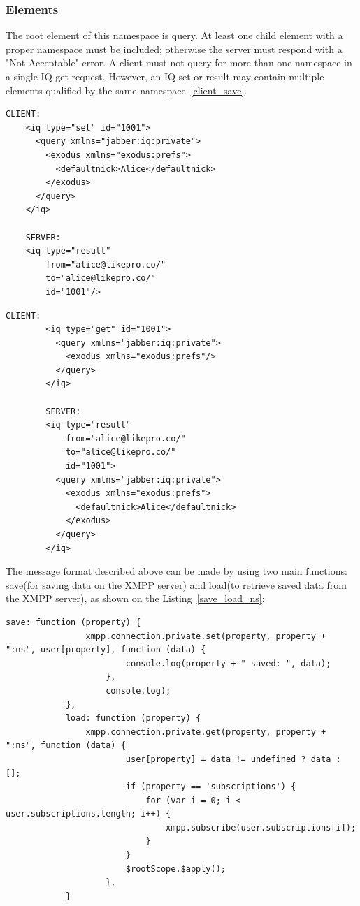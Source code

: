 	\subsubsection{Elements}
	The root element of this namespace is query. At least one child element with a proper namespace must be included; otherwise the server must respond with a "Not Acceptable" error. A client must not query for more than one namespace in a single IQ get request. However, an IQ set or result may contain multiple elements qualified by the same namespace~\ref{client_save}.
    \begin{lstlisting}[label=client_save,caption=Client Stores Private Data]
	CLIENT:
	<iq type="set" id="1001">
	  <query xmlns="jabber:iq:private">
	    <exodus xmlns="exodus:prefs">
	      <defaultnick>Alice</defaultnick>
	    </exodus>
	  </query>
	</iq>

	SERVER:
	<iq type="result"
	    from="alice@likepro.co/"
	    to="alice@likepro.co/"
	    id="1001"/>
    \end{lstlisting}

     \begin{lstlisting}[label=client_load,caption=Client Retrieves Private Data]
		CLIENT:
		<iq type="get" id="1001">
		  <query xmlns="jabber:iq:private">
		    <exodus xmlns="exodus:prefs"/>
		  </query>
		</iq>

		SERVER:
		<iq type="result"
		    from="alice@likepro.co/"
		    to="alice@likepro.co/"
		    id="1001">
		  <query xmlns="jabber:iq:private">
		    <exodus xmlns="exodus:prefs">
		      <defaultnick>Alice</defaultnick>
		    </exodus>
		  </query>
		</iq>
    \end{lstlisting}

    The message format described above can be made by using two main functions: save(for saving data on the XMPP server) and load(to retrieve saved data from the XMPP server), as shown on the Listing~\ref{save_load_ns}:
	\begin{lstlisting}[label=save_load_ns,caption=Snippet of Save/Load preferences to a private namespace]
	      	save: function (property) {
	            xmpp.connection.private.set(property, property + ":ns", user[property], function (data) {
	                    console.log(property + " saved: ", data);
	                },
	                console.log);
	        },
	        load: function (property) {
	            xmpp.connection.private.get(property, property + ":ns", function (data) {
	                    user[property] = data != undefined ? data : [];
	                    if (property == 'subscriptions') {
	                        for (var i = 0; i < user.subscriptions.length; i++) {
	                            xmpp.subscribe(user.subscriptions[i]);
	                        }
	                    }
	                    $rootScope.$apply();
	                },
	        }
	\end{lstlisting}


